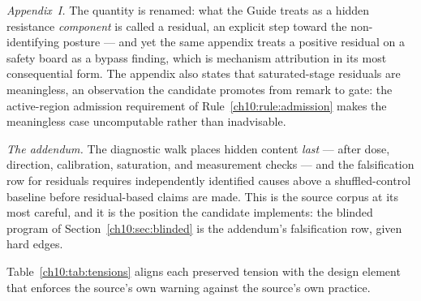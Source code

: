 \emph{Appendix~I.} The quantity is renamed: what the Guide treats as a
hidden resistance \emph{component} is called a residual, an explicit
step toward the non-identifying posture --- and yet the same appendix
treats a positive residual on a safety board as a bypass finding, which
is mechanism attribution in its most consequential form. The appendix
also states that saturated-stage residuals are meaningless, an
observation the candidate promotes from remark to gate: the
active-region admission requirement of
Rule~\ref{ch10:rule:admission} makes the meaningless case uncomputable
rather than inadvisable.

\emph{The addendum.} The diagnostic walk places hidden content
\emph{last} --- after dose, direction, calibration, saturation, and
measurement checks --- and the falsification row for residuals requires
independently identified causes above a shuffled-control baseline
before residual-based claims are made. This is the source corpus at its
most careful, and it is the position the candidate implements: the
blinded program of Section~\ref{ch10:sec:blinded} is the addendum's
falsification row, given hard edges.

Table~\ref{ch10:tab:tensions} aligns each preserved tension with the
design element that enforces the source's own warning against the
source's own practice.

